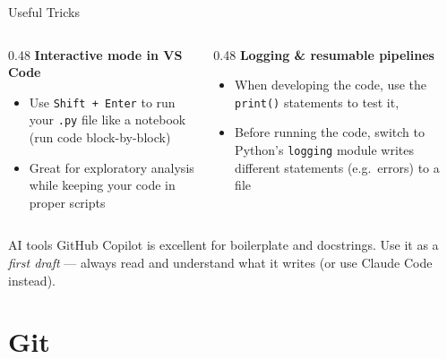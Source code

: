 \documentclass[13pt, aspectratio=169]{beamer}
\begin{document}
\begin{frame}{Useful Tricks}
    \begin{columns}
        \begin{column}{0.48\textwidth}
            \textbf{Interactive mode in VS Code}
            \begin{itemize}
                \item Use \texttt{Shift + Enter} to run your \texttt{.py} file like a notebook (run code block-by-block) 
                \item Great for exploratory analysis while keeping your code in proper scripts
            \end{itemize}
        \end{column}
        \begin{column}{0.48\textwidth}
            \textbf{Logging \& resumable pipelines}
            \begin{itemize}
                \item When developing the code, use the \texttt{print()} statements to test it, 
                \item Before running the code, switch to Python's \texttt{logging} module writes different statements (e.g.\ errors) to a file
            \end{itemize}
        \end{column}
    \end{columns}

    \vspace{0.5em}
    \begin{block}{AI tools}
        GitHub Copilot is excellent for boilerplate and docstrings. Use it as a \textit{first draft} — always read and understand what it writes (or use Claude Code instead).
    \end{block}
\end{frame}

\section{Git}
\end{document}
